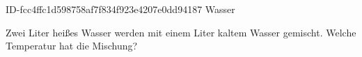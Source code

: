 \begin{exercise}
      {ID-fcc4ffc1d598758af7f834f923e4207e0dd94187}
      {Wasser}
  \ifproblem\problem\par
    Zwei Liter  heißes Wasser werden mit einem Liter 
    kaltem Wasser gemischt. Welche Temperatur hat die Mischung?
  \fi
\end{exercise}
